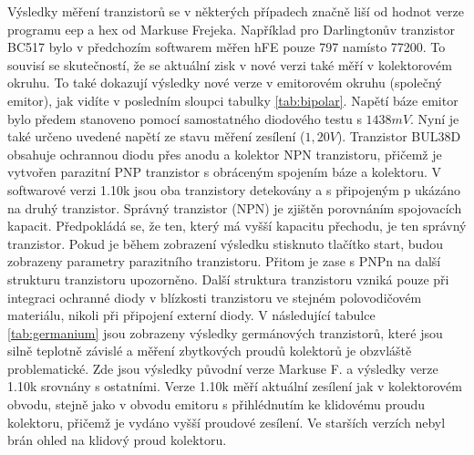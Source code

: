 Výsledky měření tranzistorů se v některých případech značně liší od hodnot verze
programu eep a hex od Markuse Frejeka.
Například pro Darlingtonův tranzistor BC517 bylo v předchozím softwarem měřen hFE pouze 797 namísto 77200.
To souvisí se skutečností, že se aktuální zisk v nové verzi také měří v kolektorovém okruhu.
To také dokazují výsledky nové verze v emitorovém okruhu (společný emitor),
jak vidíte v posledním sloupci tabulky \ref{tab:bipolar}.
Napětí báze emitor bylo předem stanoveno pomocí samostatného diodového testu s \(1438mV\).
Nyní je také určeno uvedené napětí ze stavu měření zesílení (\(1,20V\)).
Tranzistor BUL38D obsahuje ochrannou diodu přes anodu a kolektor NPN tranzistoru,
přičemž je vytvořen parazitní PNP tranzistor s obráceným spojením báze a kolektoru.
V softwarové verzi 1.10k jsou oba tranzistory detekovány a s připojeným p ukázáno na druhý tranzistor.
Správný tranzistor (NPN) je zjištěn porovnáním spojovacích kapacit.
Předpokládá se, že ten, který má vyšší kapacitu přechodu, je ten správný tranzistor.
Pokud je během zobrazení výsledku stisknuto tlačítko start, budou zobrazeny parametry parazitního tranzistoru.
Přitom je zase s PNPn na další strukturu tranzistoru upozorněno.
Další struktura tranzistoru vzniká pouze při integraci ochranné diody v blízkosti
tranzistoru ve stejném polovodičovém materiálu, nikoli při připojení externí diody.
V následující tabulce \ref{tab:germanium} jsou zobrazeny výsledky germánových tranzistorů,
které jsou silně teplotně závislé a měření zbytkových proudů kolektorů je obzvláště problematické.
Zde jsou výsledky původní verze Markuse F. a výsledky verze 1.10k srovnány s ostatními.
Verze 1.10k měří aktuální zesílení jak v kolektorovém obvodu, stejně jako v obvodu emitoru s přihlédnutím ke klidovému proudu kolektoru, přičemž je vydáno vyšší proudové zesílení.
Ve starších verzích nebyl brán ohled na klidový proud kolektoru.

